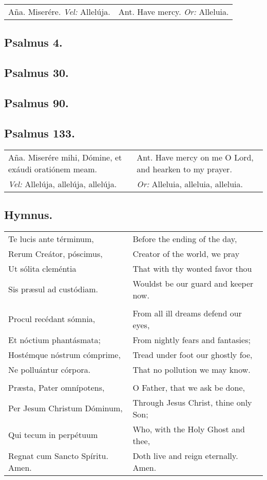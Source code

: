 \documentclass[11pt, twoside]{report}
\begin{document}
\begin{tabular}{p{8cm} | p{8cm}}
Aña. Miserére. \textit{Vel:} Allelúja. &
Ant. Have mercy. \textit{Or:} Alleluia. 
\end{tabular}

\subsection*{Psalmus 4.}


\subsection*{Psalmus 30.}


\subsection*{Psalmus 90.}


\subsection*{Psalmus 133.}


\begin{tabular}{p{8cm} | p{8cm}}
Aña. Miserére mihi, Dómine, et exáudi oratiónem meam. &
Ant. Have mercy on me O Lord, and hearken to my prayer. \\
\textit{Vel:} Allelúja, allelúja, allelúja. &
\textit{Or:} Alleluia, alleluia, alleluia. 
\end{tabular}

\subsection*{Hymnus.}
\begin{tabular}{p{8cm} | p{8cm}}
Te lucis ante términum, &
Before the ending of the day, \\
Rerum Creátor, póscimus, &
Creator of the world, we pray \\
Ut sólita cleméntia &
That with thy wonted favor thou \\
Sis præsul ad custódiam. &
Wouldst be our guard and keeper now. \\
\\
Procul recédant sómnia, &
From all ill dreams defend our eyes, \\
Et nóctium phantásmata; &
From nightly fears and fantasies; \\
Hostémque nóstrum cómprime, &
Tread under foot our ghostly foe, \\
Ne polluántur córpora. &
That no pollution we may know. \\
\\
Præsta, Pater omnípotens, &
O Father, that we ask be done, \\
Per Jesum Christum Dóminum, &
Through Jesus Christ, thine only Son; \\
Qui tecum in perpétuum &
Who, with the Holy Ghost and thee, \\
Regnat cum Sancto Spíritu. Amen. &
Doth live and reign eternally. Amen.
\end{tabular}
\end{document}
